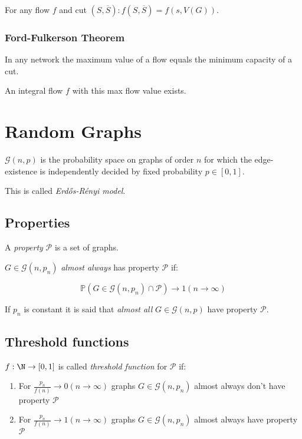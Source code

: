 \spacing

For any flow $f$ and cut $(S,\overline S) : f(S,\overline S) = f(s,V(G))$.

\subsubsection*{Ford-Fulkerson Theorem}

In any network the maximum value of a flow equals the minimum capacity of a cut.

An integral flow $f$ with this max flow value exists.

\section*{Random Graphs}

$\mathcal{G}(n,p)$ is the probability space on graphs of order $n$ for which the edge-existence is independently decided by fixed probability $p \in [0,1]$.

This is called \emph{Erd\H{o}s-R\'{e}nyi model}.

\subsection*{Properties}

A \emph{property} $\mathcal{P}$ is a set of graphs.

$G \in \mathcal{G}(n,p_n)$ \emph{almost always} has property $\mathcal{P}$ if:

\vspace*{-2mm}
$$\mathbb{P}(G \in \mathcal{G}(n,p_n) \cap \mathcal{P}) \to 1 (n \to \infty)$$

If $p_n$ is constant it is said that \emph{almost all} $G \in \mathcal{G}(n,p)$ have property $\mathcal{P}$.

\subsection*{Threshold functions}

$f : \N \to [0,1]$ is called \emph{threshold function} for $\mathcal{P}$ if:

\begin{enumerate}
	\item For $\frac{p_n}{f(n)} \to 0 (n \to \infty)$ graphs $G \in \mathcal{G}(n,p_n)$ almost always don't have property $\mathcal{P}$
	\item For $\frac{p_n}{f(n)} \to 1 (n \to \infty)$ graphs $G \in \mathcal{G}(n,p_n)$ almost always have property $\mathcal{P}$
\end{enumerate}

